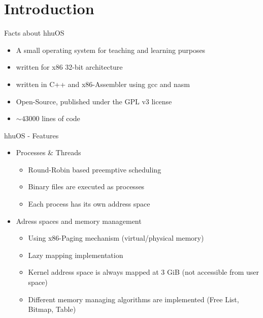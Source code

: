 \section{Introduction}
	
	\begin{frame}{Facts about hhuOS}
	\begin{itemize}
		\setlength\itemsep{1em}
		\item A small operating system for teaching and learning purposes
		\item written for x86 32-bit architecture
		\item written in C++ and x86-Assembler using gcc and nasm
		\item Open-Source, published under the GPL v3 license
		\item $\sim43000$ lines of code
	\end{itemize}
	\end{frame}
	
	\begin{frame}{hhuOS - Features}
		\begin{itemize}
			\item Processes \& Threads
			\begin{itemize}
				\item Round-Robin based preemptive scheduling
				\item Binary files are executed as processes
				\item Each process has its own address space
			\end{itemize}
			\pause
			\item Adress spaces and memory management
			\begin{itemize}
				\item Using x86-Paging mechanism (virtual/physical memory)
				\item Lazy mapping implementation
				\item Kernel address space is always mapped at 3 GiB (not accessible from user space)
				\item Different memory managing algorithms are implemented (Free List, Bitmap, Table)
			\end{itemize}
		\end{itemize}
	\end{frame}

